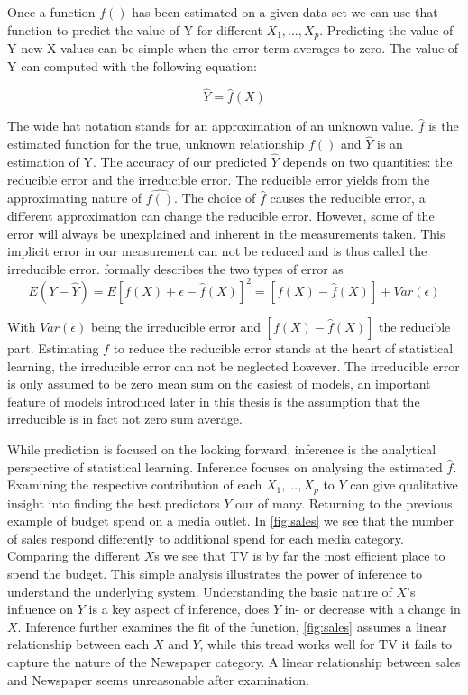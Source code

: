 \documentclass{article}
\begin{document}
    Once a function $f()$ has been estimated on a given data set we can use that function to predict the value of Y for different $X_1 , ... ,X_p$. Predicting the value of Y new X values can be simple when the error term averages to zero. The value of Y can computed with the following equation:
    
    \begin{equation}
        \widehat{Y} = \widehat{f}(X)
    \end{equation}
    
    The wide hat notation stands for an approximation of an unknown value. $\widehat{f}$ is the estimated function for the true, unknown relationship $f()$ and $\widehat{Y}$ is an estimation of Y. The accuracy of our predicted $\widehat{Y}$ depends on two quantities: the reducible error and the irreducible error. The reducible error yields from the approximating nature of $\widehat{f()}$. The choice of $\widehat{f}$ causes the reducible error, a different approximation can change the reducible error. However, some of the error will always be unexplained and inherent in the measurements taken. This implicit error in our measurement can not be reduced and is thus called the irreducible error. \cite{hastie} formally describes the two types of error as
    \begin{equation}
        E(Y-\widehat{Y}) = E[f(X)+\epsilon - \widehat{f}(X)]^2 = [f(X)-\widehat{f}(X)] + Var(\epsilon)
    \end{equation}
    
    With $Var(\epsilon)$ being the irreducible error and $[f(X)-\widehat{f}(X)]$ the reducible part. Estimating $f$ to reduce the reducible error stands at the heart of statistical learning, the irreducible error can not be neglected however. The irreducible error is only assumed to be zero mean sum on the easiest of models, an important feature of models introduced later in this thesis is the assumption that the irreducible is in fact not zero sum average. 

    
    While prediction is focused on the looking forward, inference is the analytical perspective of statistical learning. Inference focuses on analysing the estimated $\widehat{f}$. Examining the respective contribution of each $X_1, ... , X_p$ to $Y$ can give qualitative insight into finding the best predictors $Y$ our of many. Returning to the previous example of budget spend on a media outlet. In \ref{fig:sales} we see that the number of sales respond differently to additional spend for each media category. Comparing the different $X$s we see that TV is by far the most efficient place to spend the budget. This simple analysis illustrates the power of inference to understand the underlying system. Understanding the basic nature of $X$'s influence on $Y$ is a key aspect of inference, does $Y$ in- or decrease with a change in $X$.  Inference further examines the fit of the function, \ref{fig:sales} assumes a linear relationship between each $X$ and $Y$, while this tread works well for TV it fails to capture the nature of the Newspaper category. A linear relationship between sales and Newspaper seems unreasonable after examination.   
    
\end{document}
